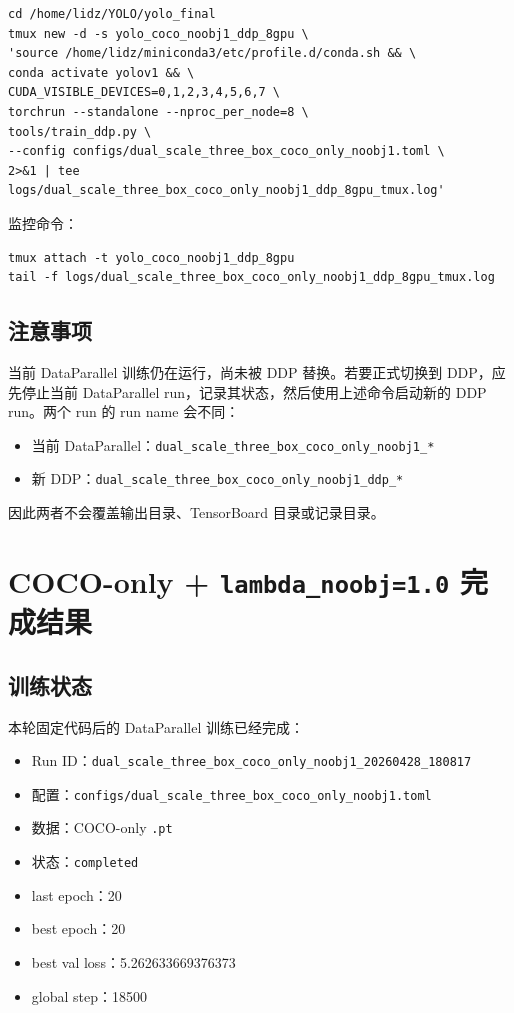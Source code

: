 \documentclass[UTF8]{ctexart}
\begin{document}
\begin{verbatim}
cd /home/lidz/YOLO/yolo_final
tmux new -d -s yolo_coco_noobj1_ddp_8gpu \
'source /home/lidz/miniconda3/etc/profile.d/conda.sh && \
conda activate yolov1 && \
CUDA_VISIBLE_DEVICES=0,1,2,3,4,5,6,7 \
torchrun --standalone --nproc_per_node=8 \
tools/train_ddp.py \
--config configs/dual_scale_three_box_coco_only_noobj1.toml \
2>&1 | tee logs/dual_scale_three_box_coco_only_noobj1_ddp_8gpu_tmux.log'
\end{verbatim}

监控命令：

\begin{verbatim}
tmux attach -t yolo_coco_noobj1_ddp_8gpu
tail -f logs/dual_scale_three_box_coco_only_noobj1_ddp_8gpu_tmux.log
\end{verbatim}

\subsection{注意事项}

当前 DataParallel 训练仍在运行，尚未被 DDP 替换。若要正式切换到 DDP，应先停止当前 DataParallel run，记录其状态，然后使用上述命令启动新的 DDP run。两个 run 的 run name 会不同：

\begin{itemize}[leftmargin=2em]
  \item 当前 DataParallel：\texttt{dual\_scale\_three\_box\_coco\_only\_noobj1\_*}
  \item 新 DDP：\texttt{dual\_scale\_three\_box\_coco\_only\_noobj1\_ddp\_*}
\end{itemize}

因此两者不会覆盖输出目录、TensorBoard 目录或记录目录。

\section{COCO-only + \texttt{lambda\_noobj=1.0} 完成结果}

\subsection{训练状态}

本轮固定代码后的 DataParallel 训练已经完成：

\begin{itemize}[leftmargin=2em]
  \item Run ID：\texttt{dual\_scale\_three\_box\_coco\_only\_noobj1\_20260428\_180817}
  \item 配置：\texttt{configs/dual\_scale\_three\_box\_coco\_only\_noobj1.toml}
  \item 数据：COCO-only \texttt{.pt}
  \item 状态：\texttt{completed}
  \item last epoch：20
  \item best epoch：20
  \item best val loss：5.262633669376373
  \item global step：18500
\end{itemize}
\end{document}
